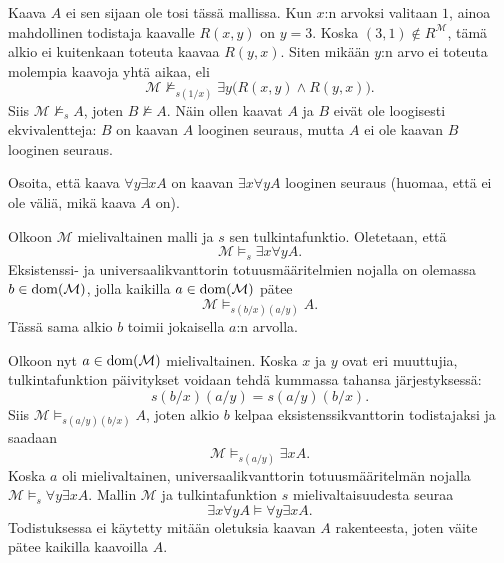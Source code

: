 \documentclass[11pt,a4paper]{amsart}
\begin{document}
\begin{solution}
  Kaava \(A\) ei sen sijaan ole tosi tässä mallissa. Kun \(x\):n arvoksi
  valitaan \(1\), ainoa mahdollinen todistaja kaavalle \(R(x,y)\) on
  \(y = 3\). Koska \((3,1) \notin R^{\mathcal M}\), tämä alkio ei kuitenkaan
  toteuta kaavaa \(R(y,x)\). Siten mikään \(y\):n arvo ei toteuta molempia
  kaavoja yhtä aikaa, eli
  \[
    \mathcal M \not\models_{s(1/x)}
    \exists y\bigl(R(x,y) \land R(y,x)\bigr).
  \]
  Siis \(\mathcal M \not\models_s A\), joten \(B \not\models A\).
  Näin ollen kaavat \(A\) ja \(B\) eivät ole loogisesti ekvivalentteja:
  \(B\) on kaavan \(A\) looginen seuraus, mutta \(A\) ei ole kaavan \(B\)
  looginen seuraus.
\end{solution}

\newpage

\begin{exercise}
  Osoita, että kaava \(\forall y\exists xA\) on kaavan
  \(\exists x\forall yA\) looginen seuraus (huomaa, että ei ole väliä,
  mikä kaava \(A\) on).
\end{exercise}

\begin{solution}
  Olkoon \(\mathcal M\) mielivaltainen malli ja \(s\) sen tulkintafunktio.
  Oletetaan, että
  \[
    \mathcal M \models_s \exists x\forall yA.
  \]
  Eksistenssi- ja universaalikvanttorin totuusmääritelmien nojalla on
  olemassa \(b \in \operatorname{dom}(\mathcal M)\), jolla kaikilla
  \(a \in \operatorname{dom}(\mathcal M)\) pätee
  \[
    \mathcal M \models_{s(b/x)(a/y)} A.
  \]
  Tässä sama alkio \(b\) toimii jokaisella \(a\):n arvolla.

  Olkoon nyt \(a \in \operatorname{dom}(\mathcal M)\) mielivaltainen. Koska \(x\) ja
  \(y\) ovat eri muuttujia, tulkintafunktion päivitykset voidaan tehdä
  kummassa tahansa järjestyksessä:
  \[
    s(b/x)(a/y) = s(a/y)(b/x).
  \]
  Siis \(\mathcal M \models_{s(a/y)(b/x)} A\), joten alkio \(b\)
  kelpaa eksistenssikvanttorin todistajaksi ja saadaan
  \[
    \mathcal M \models_{s(a/y)} \exists xA.
  \]
  Koska \(a\) oli mielivaltainen, universaalikvanttorin totuusmääritelmän
  nojalla \(\mathcal M \models_s \forall y\exists xA\).
  Mallin \(\mathcal M\) ja tulkintafunktion \(s\) mielivaltaisuudesta seuraa
  \[
    \exists x\forall yA \models \forall y\exists xA.
  \]
  Todistuksessa ei käytetty mitään oletuksia kaavan \(A\) rakenteesta,
  joten väite pätee kaikilla kaavoilla \(A\).\qedhere
\end{solution}
\end{document}

